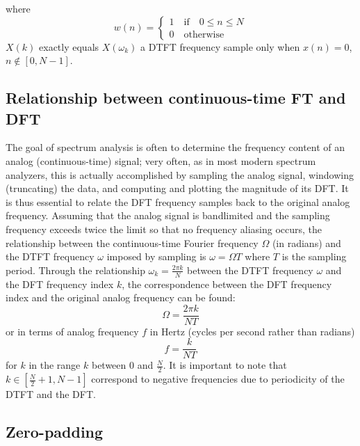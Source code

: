 \documentclass[10pt,english]{article}
\begin{document}
where  
\begin{equation}
w(n) = \begin{cases} 
1 \quad \mbox{if} \quad 0 \leq n \leq N\\
0 \quad \mbox{otherwise}   
\end{cases}
\end{equation}
$X(k)$ exactly equals $X(\omega_k)$ a DTFT frequency sample only when $x(n) = 0$, $n \not\in [0, N-1]$. \\

\subsection{Relationship between continuous-time FT and DFT}

The goal of spectrum analysis is often to determine the frequency content of an analog (continuous-time) signal; very often, as in most modern spectrum analyzers, this is actually accomplished by sampling the analog signal, windowing (truncating) the data, and computing and plotting the magnitude of its DFT. It is thus essential to relate the DFT frequency samples back to the original analog frequency. Assuming that the analog signal is bandlimited and the sampling frequency exceeds twice the limit so that no frequency aliasing occurs, the relationship between the continuous-time Fourier frequency $\Omega$ (in radians) and the DTFT frequency $\omega$ imposed by sampling is $\omega = \Omega T$ where $T$ is the sampling period. Through the relationship $\omega_k = \frac{2 \pi k }{N}$ between the DTFT frequency $\omega$ and the DFT frequency index $k$, the correspondence between the DFT frequency index and the original analog frequency can be found:
\begin{equation}
\Omega = \frac{2 \pi k}{NT}
\end{equation} 
or in terms of analog frequency $f$ in Hertz (cycles per second rather than radians)
\begin{equation}
f = \frac{k}{N T}
\end{equation}
for $k$ in the range $k$ between 0 and $\frac{N}{2}$. It is important to note that $k \in [\frac{N}{2} +1, N - 1]$ correspond to negative frequencies due to periodicity of the DTFT and the DFT.\\

\subsection{Zero-padding}
\end{document}
